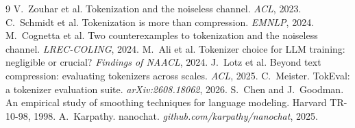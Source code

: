 \documentclass[10pt,twocolumn]{article}
\begin{document}
\begin{thebibliography}{9}\small\setlength{\itemsep}{0pt}
 V.~Zouhar et al. Tokenization and the noiseless channel. \emph{ACL}, 2023.
 C.~Schmidt et al. Tokenization is more than compression. \emph{EMNLP}, 2024.
 M.~Cognetta et al. Two counterexamples to tokenization and the noiseless channel. \emph{LREC-COLING}, 2024.
 M.~Ali et al. Tokenizer choice for LLM training: negligible or crucial? \emph{Findings of NAACL}, 2024.
 J.~Lotz et al. Beyond text compression: evaluating tokenizers across scales. \emph{ACL}, 2025.
 C.~Meister. TokEval: a tokenizer evaluation suite. \emph{arXiv:2608.18062}, 2026.
 S.~Chen and J.~Goodman. An empirical study of smoothing techniques for language modeling. Harvard TR-10-98, 1998.
 A.~Karpathy. nanochat. \emph{github.com/karpathy/nanochat}, 2025.
\end{thebibliography}
\end{document}
